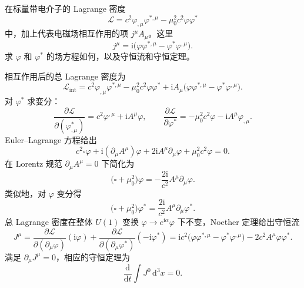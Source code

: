 \begin{question}
在标量带电介子的 Lagrange 密度
\[
\mathcal L=c^2\varphi_{,\mu}\varphi^{*,\mu}-\mu_0^2c^2\varphi\varphi^*
\]
中，加上代表电磁场相互作用的项 \(j^\mu A_\mu\)。这里
\[
j^\mu=\mathrm i\bigl(\varphi\varphi^{*,\mu}-\varphi^{*}\varphi^{,\mu}\bigr).
\]
求 \(\varphi\) 和 \(\varphi^*\) 的场方程如何，以及守恒流和守恒定理。
\begin{solution}
相互作用后的总 Lagrange 密度为
\[
\mathcal L_{\text{int}} = c^2\varphi_{,\mu}\varphi^{*,\mu}
-\mu_0^2c^2\varphi\varphi^* + \mathrm i A_\mu
\bigl(\varphi\varphi^{*,\mu}-\varphi^{*}\varphi^{,\mu}\bigr).
\]
对 \(\varphi^*\) 求变分：
\[
\frac{\partial\mathcal L}{\partial(\varphi^*_{,\mu})}=c^2\varphi^{,\mu}+\mathrm i A^\mu\varphi,\qquad
\frac{\partial\mathcal L}{\partial\varphi^*}=-\mu_0^2c^2\varphi-\mathrm i A^\mu\varphi_{,\mu}.
\]
Euler--Lagrange 方程给出
\[
c^2\square\varphi+\mathrm i(\partial_\mu A^\mu)\varphi+2\mathrm i A^\mu\partial_\mu\varphi
+\mu_0^2c^2\varphi=0 .
\]
在 Lorentz 规范 \(\partial_\mu A^\mu=0\) 下简化为
\[
\bigl(\square+\mu_0^2\bigr)\varphi = -\frac{2\mathrm i}{c^2}A^\mu\partial_\mu\varphi .
\]
类似地，对 \(\varphi\) 变分得
\[
\bigl(\square+\mu_0^2\bigr)\varphi^* = \frac{2\mathrm i}{c^2}A^\mu\partial_\mu\varphi^* .
\]
总 Lagrange 密度在整体 \(U(1)\) 变换 \(\varphi\to e^{\mathrm i\alpha}\varphi\) 下不变，Noether 定理给出守恒流
\[
J^\mu = \frac{\partial\mathcal L}{\partial(\partial_\mu\varphi)}(\mathrm i\varphi)
+\frac{\partial\mathcal L}{\partial(\partial_\mu\varphi^*)}(-\mathrm i\varphi^*)
= \mathrm i c^2\bigl(\varphi\varphi^{*,\mu}-\varphi^{*}\varphi^{,\mu}\bigr)
-2c^2A^\mu\varphi\varphi^* .
\]
满足 \(\partial_\mu J^\mu=0\)，相应的守恒定理为
\[
\frac{\mathrm d}{\mathrm d t}\int J^0\,\mathrm d^3x = 0 .
\]
\end{solution}
\end{question}

